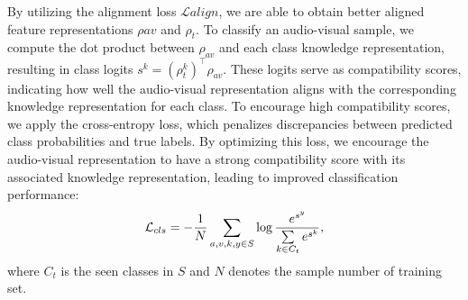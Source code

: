 \documentclass[10pt,twocolumn,letterpaper]{article}
\begin{document}
By utilizing the alignment loss $\mathcal{L}{align}$, we are able to obtain better aligned feature representations $\rho{av}$ and $\rho_{t}$. To classify an audio-visual sample, we compute the dot product between $\rho_{av}$ and each class knowledge representation, resulting in class logits $s^k = (\rho^k_{t})^\top \rho_{av}$. These logits serve as compatibility scores, indicating how well the audio-visual representation aligns with the corresponding knowledge representation for each class. To encourage high compatibility scores, we apply the cross-entropy loss, which penalizes discrepancies between predicted class probabilities and true labels. By optimizing this loss, we encourage the audio-visual representation to have a strong compatibility score with its associated knowledge representation, leading to improved classification performance:
\begin{equation}
\mathcal{L}_{cls} = -\frac{1}{N} \sum_{{a,v,k,y}\in S} {\rm log}\,\frac{e^{s^y}}{\sum\limits_{k\in C_t} e^{s^k}},
\end{equation}
where $C_t$ is the seen classes in $S$ and $N$ denotes the sample number of training set. 
\end{document}
